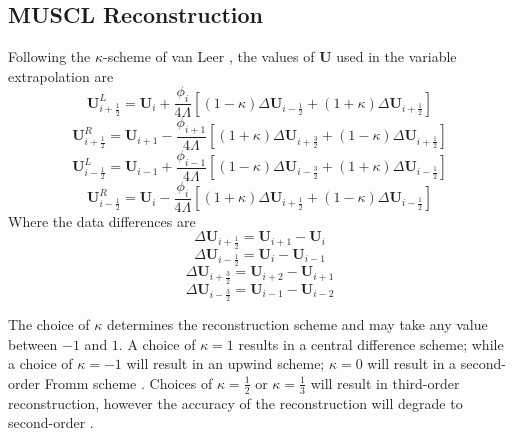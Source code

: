 \subsection{MUSCL Reconstruction}

Following the $\kappa$-scheme of van Leer \cite{VANLEER1977263}, the values of $\boldsymbol{U}$ used in the variable extrapolation are
\begin{equation}
	\boldsymbol{U}^L_{i+\frac{1}{2}} = \boldsymbol{U}_i + \frac{\phi_i}{4 \Lambda} \left[\left(1-\kappa\right)\Delta \boldsymbol{U}_{i-\frac{1}{2}} + \left(1+\kappa\right)\Delta \boldsymbol{U}_{i+\frac{1}{2}}\right]
\end{equation}
\begin{equation}
	\boldsymbol{U}^R_{i+\frac{1}{2}} = \boldsymbol{U}_{i+1} - \frac{\phi_{i+1}}{4 \Lambda} \left[\left(1+\kappa\right)\Delta \boldsymbol{U}_{i+\frac{3}{2}} + \left(1-\kappa\right)\Delta \boldsymbol{U}_{i+\frac{1}{2}}\right]
\end{equation}
\begin{equation}
	\boldsymbol{U}^L_{i-\frac{1}{2}} = \boldsymbol{U}_{i-1} + \frac{\phi_{i-1}}{4 \Lambda} \left[\left(1-\kappa\right)\Delta \boldsymbol{U}_{i-\frac{3}{2}} + \left(1+\kappa\right)\Delta \boldsymbol{U}_{i-\frac{1}{2}}\right]
\end{equation}
\begin{equation}
	\boldsymbol{U}^R_{i-\frac{1}{2}} = \boldsymbol{U}_i - \frac{\phi_i}{4 \Lambda} \left[\left(1+\kappa\right)\Delta \boldsymbol{U}_{i+\frac{1}{2}} + \left(1-\kappa\right)\Delta \boldsymbol{U}_{i-\frac{1}{2}}\right]
\end{equation}
Where the data differences are
\begin{equation}
	\Delta \boldsymbol{U}_{i+\frac{1}{2}} = \boldsymbol{U}_{i+1} - \boldsymbol{U}_{i}
\end{equation}
\begin{equation}
	\Delta \boldsymbol{U}_{i-\frac{1}{2}} = \boldsymbol{U}_{i} - \boldsymbol{U}_{i-1}
\end{equation}
\begin{equation}
	\Delta \boldsymbol{U}_{i+\frac{3}{2}} = \boldsymbol{U}_{i+2} - \boldsymbol{U}_{i+1}
\end{equation}
\begin{equation}
	\Delta \boldsymbol{U}_{i-\frac{3}{2}} = \boldsymbol{U}_{i-1} - \boldsymbol{U}_{i-2}
\end{equation}

The choice of $\kappa$ determines the reconstruction scheme and may take any value between $-1$ and $1$. A choice of $\kappa = 1$ results in a central difference scheme; while a choice of $\kappa = -1$ will result in an upwind scheme; $\kappa = 0$ will result in a second-order Fromm scheme \cite{hirsch2007numerical}. Choices of $\kappa = \frac{1}{2}$ or $\kappa = \frac{1}{3}$ will result in third-order reconstruction, however the accuracy of the reconstruction will degrade to second-order \cite{Nishikawa}. 

